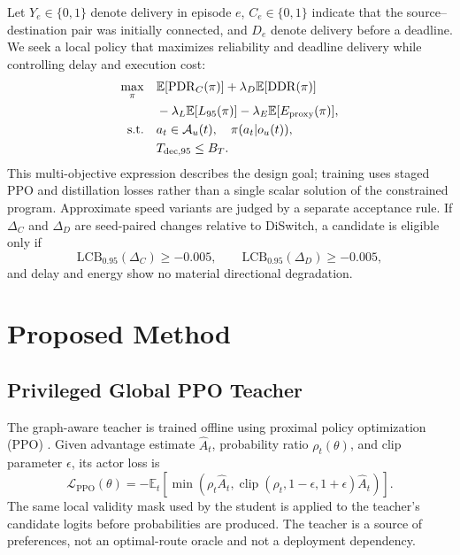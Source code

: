 \documentclass{ieeeaccess}
\newcommand{\DS}{DiSwitch}
\newcommand{\pdr}{\mathrm{PDR}}
\newcommand{\E}{\mathbb{E}}
\begin{document}
Let $Y_e\in\{0,1\}$ denote delivery in episode $e$, $C_e\in\{0,1\}$ indicate that the source--destination pair was initially connected, and $D_e$ denote delivery before a deadline. We seek a local policy that maximizes reliability and deadline delivery while controlling delay and execution cost:
\begin{align}
\max_{\pi} \quad
& \E[\pdr_C(\pi)] + \lambda_D\E[\mathrm{DDR}(\pi)] \notag\\
& {}-\lambda_L\E[L_{95}(\pi)]-\lambda_E\E[E_{\mathrm{proxy}}(\pi)],\\
\text{s.t.}\quad
& a_t\in\mathcal{A}_u(t),\quad \pi(a_t|o_u(t)), \notag\\
& T_{\mathrm{dec},95}\leq B_T.
\end{align}
This multi-objective expression describes the design goal; training uses staged PPO and distillation losses rather than a single scalar solution of the constrained program. Approximate speed variants are judged by a separate acceptance rule. If $\Delta_C$ and $\Delta_D$ are seed-paired changes relative to \DS{}, a candidate is eligible only if
\begin{equation}
\mathrm{LCB}_{0.95}(\Delta_C)\geq-0.005,\qquad
\mathrm{LCB}_{0.95}(\Delta_D)\geq-0.005,
\label{eq:gate}
\end{equation}
and delay and energy show no material directional degradation.

\section{Proposed Method}

\subsection{Privileged Global PPO Teacher}

The graph-aware teacher is trained offline using proximal policy optimization (PPO) \cite{schulman2017ppo}. Given advantage estimate $\hat A_t$, probability ratio $\rho_t(\theta)$, and clip parameter $\epsilon$, its actor loss is
\begin{equation}
\mathcal{L}_{\mathrm{PPO}}(\theta)=-\E_t\!\left[\min\left(\rho_t\hat A_t,\operatorname{clip}(\rho_t,1-\epsilon,1+\epsilon)\hat A_t\right)\right].
\end{equation}
The same local validity mask used by the student is applied to the teacher's candidate logits before probabilities are produced. The teacher is a source of preferences, not an optimal-route oracle and not a deployment dependency.
\end{document}
